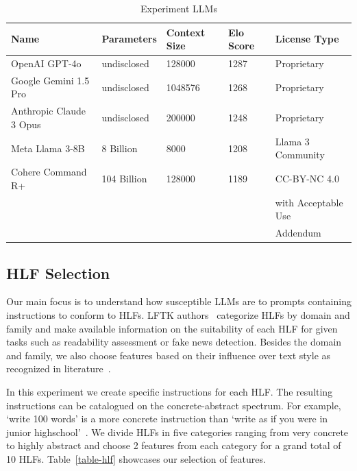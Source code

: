 \documentclass[runningheads,a4paper,11pt]{article}
\begin{document}
\begin{table}[ht]
    \setlength\tabcolsep{6pt}
    \centering
    \begin{tabular}{@{}lllll@{}}
        \toprule
        Name                    & Parameters  & Context Size & Elo Score & License Type        \\ \toprule
        OpenAI GPT-4o           & undisclosed & 128000       & 1287      & Proprietary         \\
        Google Gemini 1.5 Pro   & undisclosed & 1048576      & 1268      & Proprietary         \\
        Anthropic Claude 3 Opus & undisclosed & 200000       & 1248      & Proprietary         \\
        Meta Llama 3-8B         & 8 Billion   & 8000         & 1208      & Llama 3 Community   \\
        Cohere Command R+       & 104 Billion & 128000       & 1189      & CC-BY-NC 4.0        \\
                                &             &              &           & with Acceptable Use \\
                                &             &              &           & Addendum            \\ \bottomrule
    \end{tabular}
    \caption{Experiment LLMs}\label{table-llm}
\end{table}

\subsection{HLF Selection}\label{hlf-selection}

Our main focus is to understand how susceptible LLMs are to prompts containing
instructions to conform to HLFs.
LFTK authors~\cite{lftk-2023} categorize HLFs by domain and family and make
available information on the suitability of each HLF for given tasks such as
readability assessment or fake news detection.
Besides the domain and family, we also choose features based on their influence
over text style as recognized in literature~\cite{verma2019lexical,lugea2023stylistics}.

In this experiment we create specific instructions for each HLF.
The resulting instructions can be catalogued on the concrete-abstract spectrum.
For example, `write 100 words' is a more concrete instruction than `write as if
you were in junior highschool'~\cite{kincaid1975derivation}.
We divide HLFs in five categories ranging from very concrete to highly abstract
and choose 2 features from each category for a grand total of 10 HLFs.
Table~\ref{table-hlf} showcases our selection of features.
\end{document}
